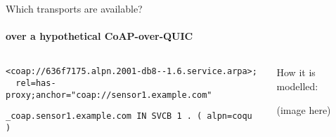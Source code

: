 
\begin{frame}[fragile]{Which transports are available?}
    \framesubtitle{over a hypothetical CoAP-over-QUIC}
    \begin{columns}
        \begin{column}{0.7\textwidth}
\begin{verbatim}
<coap://636f7175.alpn.2001-db8--1.6.service.arpa>;
  rel=has-proxy;anchor="coap://sensor1.example.com"
\end{verbatim}
           
            \vspace{1cm}

\begin{verbatim}
_coap.sensor1.example.com IN SVCB 1 . ( alpn=coqu )
\end{verbatim}
        \end{column}
        \begin{column}{0.3\textwidth}
            How it is modelled:
            
            (image here)
        \end{column}
    \end{columns}
\end{frame}


%
% 
% 

